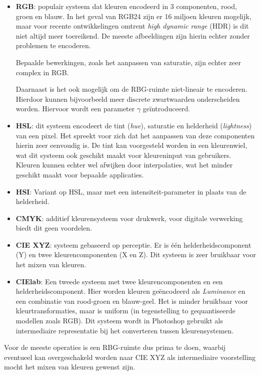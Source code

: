 \documentclass[twocolumn, a4paper]{article}
\begin{document}
\begin{itemize}
    \item \textbf{RGB}: populair systeem dat kleuren encodeerd in 3 componenten, rood, groen en blauw. In het geval van RGB24 zijn er 16 miljoen kleuren mogelijk, maar voor recente ontwikkelingen omtrent \emph{high dynamic range} (HDR) is dit niet altijd meer toereikend. De meeste afbeeldingen zijn hierin echter zonder problemen te encoderen. 

    Bepaalde bewerkingen, zoals het aanpassen van saturatie, zijn echter zeer complex in RGB. 

    Daarnaast is het ook mogelijk om de RBG-ruimte niet-lineair te encoderen. Hierdoor kunnen bijvoorbeeld meer discrete zwartwaarden onderscheiden worden. Hiervoor wordt een parameter $\gamma$ geïntroduceerd.
    
    \item \textbf{HSL}: dit systeem encodeert de tint (\emph{hue}), saturatie en helderheid (\emph{lightness}) van een pixel. Het spreekt voor zich dat het aanpassen van deze componenten hierin zeer eenvoudig is. De tint kan voorgesteld worden in een kleurenwiel, wat dit systeem ook geschikt maakt voor kleureninput van gebruikers. Kleuren kunnen echter wel afwijken door interpolaties, wat het minder geschikt maakt voor bepaalde applicaties.

    \item \textbf{HSI}: Variant op HSL, maar met een intensiteit-parameter in plaats van de helderheid.  
    \item \textbf{CMYK}: additief kleurensysteem voor drukwerk, voor digitale verwerking biedt dit geen voordelen. 
    \item \textbf{CIE XYZ}: systeem gebaseerd op perceptie. Er is één helderheidscomponent (Y) en twee kleurencomponenten (X en Z). Dit systeem is zeer bruikbaar voor het mixen van kleuren.
    \item \textbf{CIElab}: Een tweede systeem met twee kleurencomponenten en een helderheidscomponent. Hier worden kleuren geëncodeerd als \emph{Luminance} en een combinatie van rood-groen en blauw-geel. Het is minder bruikbaar voor kleurtransformaties, maar is uniform (in tegenstelling to gequantiseerde modellen zoals RGB). Dit systeem wordt in Photoshop gebruikt als intermediaire representatie bij het converteren tussen kleurensystemen.
\end{itemize}

Voor de meeste operaties is een RBG-ruimte dus prima te doen, waarbij eventueel kan overgeschakeld worden naar CIE XYZ als intermediaire voorstelling mocht het mixen van kleuren gewenst zijn. 
\end{document}
